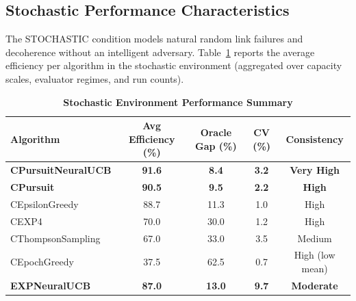\documentclass[12pt,a4paper]{article}
\newcommand{\stochastic}[1]{\textcolor{stochasticcolor}{\textbf{#1}}}
\newcommand{\legacy}[1]{\textcolor{legacycolor}{\textbf{#1}}}
\newcommand{\neural}[1]{\textcolor{neuralcolor}{\textbf{#1}}}
\begin{document}
\begin{tcolorbox}[colback=stochasticcolor!10,colframe=stochasticcolor,title=\textbf{Stochastic Environment Deep Analysis (1$\times$–2$\times$ Capacities, T/Tb Combined)}]

\subsection{Stochastic Performance Characteristics}

The STOCHASTIC condition models natural random link failures and decoherence without an intelligent adversary. Table~\ref{tab:stoch-performance} reports the average efficiency per algorithm in the stochastic environment (aggregated over capacity scales, evaluator regimes, and run counts).

\begin{table}[H]
\centering
\caption{\stochastic{Stochastic Environment Performance Summary}}
\label{tab:stoch-performance}
\begin{tabular}{|l|c|c|c|c|}
\hline
\textbf{Algorithm} & \textbf{Avg Efficiency (\%)} & \textbf{Oracle Gap (\%)} & \textbf{CV (\%)} & \textbf{Consistency} \\
\hline
\hline
\neural{CPursuitNeuralUCB}   & \neural{\textbf{91.6}} & \neural{8.4}      & \neural{3.2}     & \neural{Very High} \\
\stochastic{CPursuit}        & \stochastic{\textbf{90.5}} & \stochastic{9.5}  & \stochastic{2.2} & \stochastic{High} \\
CEpsilonGreedy               & 88.7                        & 11.3              & 1.0              & High \\
CEXP4                        & 70.0                        & 30.0              & 1.2              & High \\
CThompsonSampling            & 67.0                        & 33.0              & 3.5              & Medium \\
CEpochGreedy                 & 37.5                        & 62.5              & 0.7              & High (low mean) \\
\legacy{EXPNeuralUCB}        & \legacy{87.0}               & \legacy{13.0}     & \legacy{9.7}     & \legacy{Moderate} \\
\hline
\end{tabular}
\end{table}


\end{tcolorbox}
\end{document}
